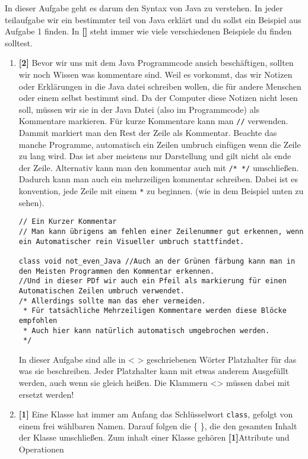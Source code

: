 
In dieser Aufgabe geht es darum den Syntax von Java zu verstehen.
In jeder teilaufgabe wir ein bestimmter teil von Java erklärt und du sollst ein Beispiel aus Aufgabe 1 finden. In \textbf{[]} steht immer wie viele verschiedenen Beispiele du finden solltest.

\begin{enumerate}
    \item \textbf{[2]} Bevor wir uns mit dem Java Programmcode ansich beschäftigen, sollten wir noch Wissen was kommentare sind.
    Weil es vorkommt, das wir Notizen oder Erklärungen in die Java datei schreiben wollen, die für andere Menschen oder einem selbst bestimmt sind. Da der Computer diese Notizen nicht lesen soll, müssen wir sie in der Java Datei (also im Programmcode) als Kommentare markieren.
          Für kurze Kommentare kann man \lstinline[breaklines=false]{//} verwenden. Dammit markiert man den Rest der Zeile als Kommentar. Beachte das manche Programme, automatisch ein Zeilen umbruch einfügen wenn die Zeile zu lang wird.
          Das ist aber meistens nur Darstellung und gilt nicht als ende der Zeile.
          Alternativ kann man den kommentar auch mit \lstinline[breaklines=false]{/* */} umschließen. Dadurch kann man auch ein mehrzeiligen kommentar schreiben. Dabei ist es konvention, jede Zeile mit einem \textcolor{javagreen}{\texttt{*}} zu beginnen. (wie in dem Beispiel unten zu sehen).
          \begin{lstlisting}[title=\textbf{Kommentar Beispiel}]
// Ein Kurzer Kommentar 
// Man kann übrigens am fehlen einer Zeilenummer gut erkennen, wenn ein Automatischer rein Visueller umbruch stattfindet.
    
class void not_even_Java //Auch an der Grünen färbung kann man in den Meisten Programmen den Kommentar erkennen.
//Und in dieser PDf wir auch ein Pfeil als markierung für einen Automatischen Zeilen umbruch verwendet.
/* Allerdings sollte man das eher vermeiden.
 * Für tatsächliche Mehrzeiligen Kommentare werden diese Blöcke empfohlen
 * Auch hier kann natürlich automatisch umgebrochen werden.
 */
        \end{lstlisting}
        In dieser Aufgabe sind alle in < > geschriebenen Wörter Platzhalter für das was sie beschreiben. Jeder Platzhalter kann mit etwas anderem Ausgefüllt werden, auch wenn sie gleich heißen. Die Klammern <> müssen dabei mit ersetzt werden!
    \item \textbf{[1]} Eine Klasse hat immer am Anfang das Schlüsselwort \lstinline{class}, gefolgt von einem frei wählbaren Namen. Darauf folgen die \{ \}, die den gesamten Inhalt der Klasse umschließen.
          Zum inhalt einer Klasse gehören \textbf{[1]}Attribute und Operationen


\end{enumerate}
